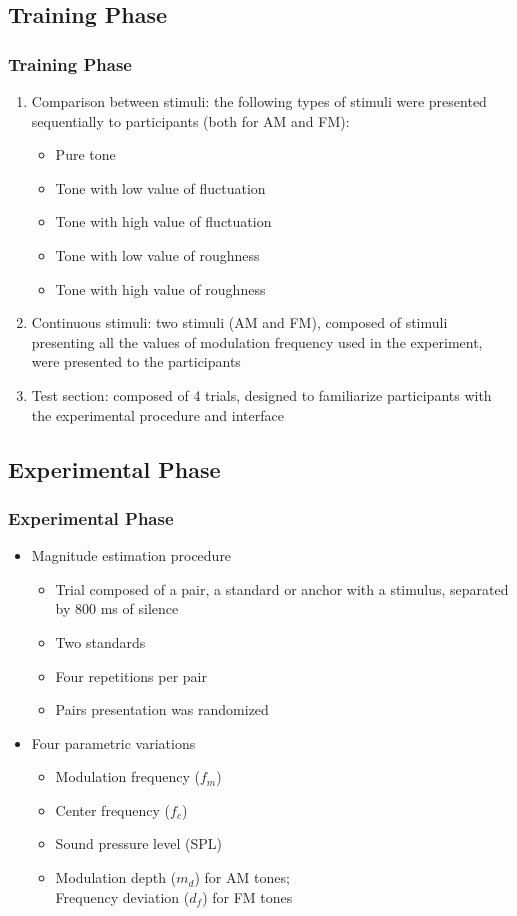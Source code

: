 \documentclass{beamer}
\begin{document}
\subsection{Training Phase}
\begin{frame}
  \frametitle{Training Phase}
  \begin{enumerate}
    \item Comparison between stimuli: the following types of stimuli were
      presented sequentially to participants (both for AM and FM):
      \begin{itemize}
        \item Pure tone
        \item Tone with low value of fluctuation
        \item Tone with high value of fluctuation
        \item Tone with low value of roughness
        \item Tone with high value of roughness
      \end{itemize}
    \item Continuous stimuli: two stimuli (AM and FM), composed of stimuli
      presenting all the values of modulation frequency used in the experiment,
      were presented to the participants
    \item Test section: composed of 4 trials, designed to familiarize
      participants with the experimental procedure and interface
  \end{enumerate}
\end{frame}

\subsection{Experimental Phase}
\begin{frame}
  \frametitle{Experimental Phase}
  \begin{itemize}
    \item Magnitude estimation procedure
    \begin{itemize}
      \item Trial composed of a pair, a standard or anchor with a stimulus,
        separated by 800 ms of silence
      \item Two standards
      \item Four repetitions per pair
      \item Pairs presentation was randomized
    \end{itemize}
    \item Four parametric variations
    \begin{itemize}
      \item Modulation frequency ($f_m$)
      \item Center frequency ($f_c$)
      \item Sound pressure level (SPL)
      \item Modulation depth ($m_d$) for AM tones;\\Frequency deviation ($d_f$)
        for FM tones
    \end{itemize}
  \end{itemize}
\end{frame}
\end{document}

